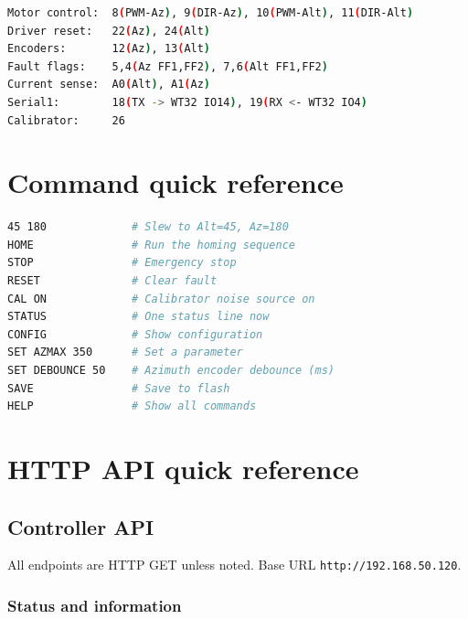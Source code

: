 \documentclass[11pt,a4paper]{article}
\begin{document}
\begin{lstlisting}[language=bash,caption={Arduino Due pin summary}]
Motor control:  8(PWM-Az), 9(DIR-Az), 10(PWM-Alt), 11(DIR-Alt)
Driver reset:   22(Az), 24(Alt)
Encoders:       12(Az), 13(Alt)
Fault flags:    5,4(Az FF1,FF2), 7,6(Alt FF1,FF2)
Current sense:  A0(Alt), A1(Az)
Serial1:        18(TX -> WT32 IO14), 19(RX <- WT32 IO4)
Calibrator:     26
\end{lstlisting}

\section{Command quick reference}

\begin{lstlisting}[language=bash,caption={Common Due serial commands}]
45 180             # Slew to Alt=45, Az=180
HOME               # Run the homing sequence
STOP               # Emergency stop
RESET              # Clear fault
CAL ON             # Calibrator noise source on
STATUS             # One status line now
CONFIG             # Show configuration
SET AZMAX 350      # Set a parameter
SET DEBOUNCE 50    # Azimuth encoder debounce (ms)
SAVE               # Save to flash
HELP               # Show all commands
\end{lstlisting}

\section{HTTP API quick reference}
\label{app:api}

\subsection{Controller API}

All endpoints are HTTP GET unless noted. Base URL \texttt{http://192.168.50.120}.

\subsubsection{Status and information}
\end{document}
